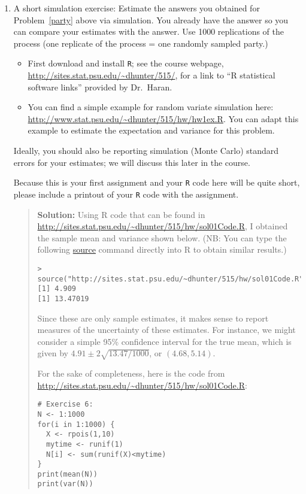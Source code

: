 \documentclass{article}
\begin{document}
\begin{enumerate}
\begin{enumerate}
  \end{enumerate}

  \item A short simulation exercise: Estimate the answers you obtained for
  Problem~\ref{party} above via simulation. You already have the answer so you
  can compare your estimates with the answer. Use 1000 replications of the
  process (one replicate of the process = one randomly sampled party.)

  \begin{itemize}

      \item First download and install {\tt R}; see the course webpage,
      \url{http://sites.stat.psu.edu/~dhunter/515/}, for a link to ``R
      statistical software links'' provided by Dr.~Haran.

      \item You can find a simple example for random variate simulation here:
      \url{http://www.stat.psu.edu/~dhunter/515/hw/hw1ex.R}. You can adapt this
      example to estimate the expectation and variance for this problem.

  \end{itemize}

  Ideally, you should also be reporting simulation (Monte Carlo) standard errors
  for your estimates; we will discuss this later in the course.

  Because this is your first assignment and your {\tt R} code here will be quite
  short, please include a printout of your {\tt R} code with the assignment.

      \begin{quotation} {\bf Solution:}
      Using R code that can be found in \url{http://sites.stat.psu.edu/~dhunter/515/hw/sol01Code.R},
      I obtained the sample mean and variance shown below.  (NB:  You can type the following
      \url{source} command directly into R to obtain similar results.)
      \begin{verbatim}
> source("http://sites.stat.psu.edu/~dhunter/515/hw/sol01Code.R")
[1] 4.909 
[1] 13.47019
      \end{verbatim}
      Since these are only sample estimates, it makes sense to report measures of 
      the uncertainty of these estimates.  For instance, we might consider a simple 95\%
      confidence interval for the true mean, which is given by
      $4.91 \pm 2\sqrt{13.47/1000}$, or $(4.68, 5.14)$.
      
      For the sake of completeness, here is the code from
      \url{http://sites.stat.psu.edu/~dhunter/515/hw/sol01Code.R}:
      \begin{verbatim}
# Exercise 6:
N <- 1:1000
for(i in 1:1000) {
  X <- rpois(1,10)
  mytime <- runif(1)
  N[i] <- sum(runif(X)<mytime)
}
print(mean(N))
print(var(N))
      \end{verbatim}
      \end{quotation}

\end{enumerate}
\end{document}
